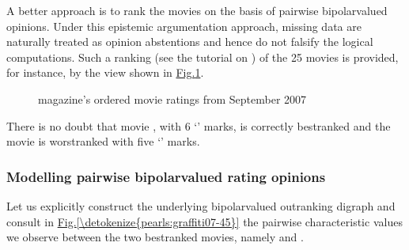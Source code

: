 \documentclass[a4paper,12pt,english]{sphinxhowto}
\let\sphinxpxdimen\pdfpxdimen\else\newdimen\sphinxpxdimen
\begin{document}
\sphinxAtStartPar
A better approach is to rank the movies on the basis of pairwise bipolar\sphinxhyphen{}valued   opinions. Under this epistemic argumentation approach, missing data are naturally treated as opinion abstentions and hence do not falsify the logical computations. Such a ranking (see the tutorial on ) of the 25 movies is provided, for instance, by the  view shown in \hyperref[\detokenize{pearls:graffiti07-2}]{Fig.\@ \ref{\detokenize{pearls:graffiti07-2}}}.

\begin{sphinxVerbatim}[commandchars=\\\{\}]
                             
                             
\end{sphinxVerbatim}

\begin{figure}[H]
\centering
\capstart

\noindent\sphinxincludegraphics[width=600\sphinxpxdimen]{{graffiti07_2}.png}
\caption{ magazine’s ordered movie ratings from September 2007}\label{\detokenize{pearls:graffiti07-2}}\end{figure}

\sphinxAtStartPar
There is no doubt that movie , with 6 ‘’ marks, is correctly best\sphinxhyphen{}ranked and the movie  is worst\sphinxhyphen{}ranked with five ‘’ marks.


\subsubsection{Modelling pairwise bipolar\sphinxhyphen{}valued rating opinions}
\label{\detokenize{pearls:modelling-pairwise-bipolar-valued-rating-opinions}}
\sphinxAtStartPar
Let us explicitly construct the underlying bipolar\sphinxhyphen{}valued outranking digraph and consult in \hyperref[\detokenize{pearls:graffiti07-45}]{Fig.\@ \ref{\detokenize{pearls:graffiti07-45}}} the pairwise characteristic values we observe between the two best\sphinxhyphen{}ranked movies, namely  and .
\end{document}
